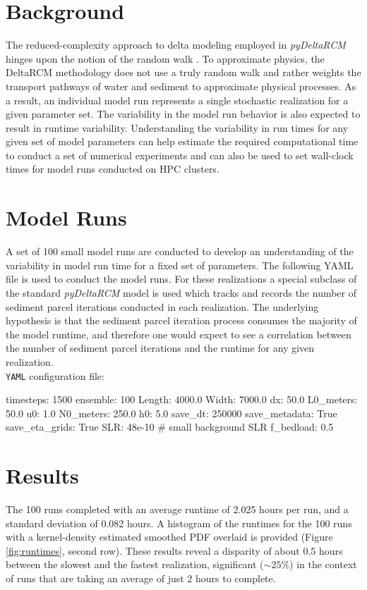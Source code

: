 \section{Background}
The reduced-complexity approach to delta modeling employed in \textit{pyDeltaRCM} hinges upon the notion of the random walk \cite{Pearson1905}.
To approximate physics, the DeltaRCM methodology does not use a truly random walk and rather weights the transport pathways of water and sediment to approximate physical processes.
As a result, an individual model run represents a single stochastic realization for a given parameter set. 
The variability in the model run behavior is also expected to result in runtime variability.
Understanding the variability in run times for any given set of model parameters can help estimate the required computational time to conduct a set of numerical experiments and can also be used to set wall-clock times for model runs conducted on HPC clusters. 

\section{Model Runs}
A set of 100 small model runs are conducted to develop an understanding of the variability in model run time for a fixed set of parameters.
The following YAML file is used to conduct the model runs.
For these realizations a special subclass of the standard \textit{pyDeltaRCM} model is used which tracks and records the number of sediment parcel iterations conducted in each realization.
The underlying hypothesis is that the sediment parcel iteration process consumes the majority of the model runtime, and therefore one would expect to see a correlation between the number of sediment parcel iterations and the runtime for any given realization.\\

\noindent \texttt{YAML} configuration file: \vspace{-6pt}
\begin{boxedverbatim}
timesteps: 1500
ensemble: 100
Length: 4000.0
Width: 7000.0
dx: 50.0
L0_meters: 50.0
u0: 1.0
N0_meters: 250.0
h0: 5.0
save_dt: 250000
save_metadata: True
save_eta_grids: True
SLR: 48e-10  # small background SLR
f_bedload: 0.5
\end{boxedverbatim}

\section{Results}
The 100 runs completed with an average runtime of 2.025 hours per run, and a standard deviation of 0.082 hours. 
A histogram of the runtimes for the 100 runs with a kernel-density estimated smoothed PDF overlaid is provided (Figure \ref{fig:runtimes}, second row).
These results reveal a disparity of about 0.5 hours between the slowest and the fastest realization, significant ($\sim25\%$) in the context of runs that are taking an average of just 2 hours to complete. 


